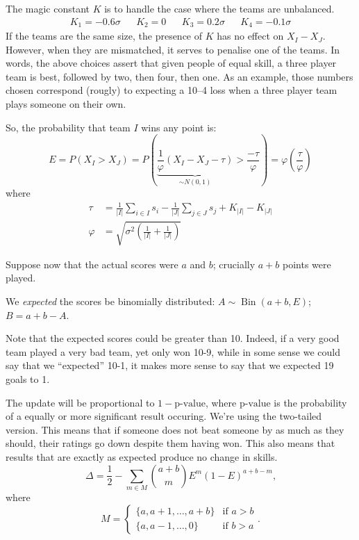 \documentclass{article}
\begin{document}
The magic constant $K$ is to handle the case where the teams are unbalanced.
\begin{align*}
    K_1 = -0.6\sigma &&
    K_2 =  0 &&
    K_3 =  0.2\sigma &&
    K_4 = -0.1\sigma
\end{align*}
If the teams are the same size, the presence of $K$ has no effect on $X_I - X_J$. However, when they are mismatched, it serves to penalise one of the teams.
In words, the above choices assert that given people of equal skill, a three player team is best, followed by two, then four, then one. As an example, those numbers chosen correspond (rougly) to expecting a 10--4 loss when a three player team plays someone on their own.

So, the probability that team $I$ wins any point is:
\[
    E = P( X_I > X_J ) = P\left( \underbrace{ \frac{1}{\varphi} ( X_I - X_J - \tau ) }_{\sim N(0, 1)}
                                 > \frac{-\tau}{\varphi} \right)
                       = \varphi\left( \frac{\tau}{\varphi} \right)
\]
where
\begin{align*}
    \tau &= \frac{1}{|I|} \sum_{i \in I} s_i - \frac{1}{|J|} \sum_{j \in J} s_j + K_{|I|} - K_{|J|} \\
    \varphi &= \sqrt{ \sigma^2 \left( \frac{1}{|I|} + \frac{1}{|J|} \right) }
\end{align*}

Suppose now that the actual scores were $a$ and $b$; crucially $a + b$ points were played.

We {\it expected} the scores be binomially distributed: $A\sim\operatorname{Bin}(a + b, E)$; $B = a + b - A$.

Note that the expected scores could be greater than 10. Indeed, if a very good team played a very bad team, yet only won 10-9, while in some sense we could say that we ``expected'' 10-1, it makes more sense to say that we expected 19 goals to 1.

The update will be proportional to $1 - \text{p-value}$, where $\text{p-value}$ is the probability of a equally or more significant result occuring. We're using the two-tailed version. This means that if someone does not beat someone by as much as they should, their ratings go down despite them having won. This also means that results that are exactly as expected produce no change in skills.
\[
    \Delta = \frac{1}{2} - \sum_{m \in M} {a + b \choose m} E^m (1 - E)^{a + b - m}
    \text{,}
\]
where
\[
    M = \begin{cases}
        \{ a, a + 1, \ldots, a + b \}  &\text{if } a > b \\
        \{ a, a - 1, \ldots, 0 \}      &\text{if } b > a
    \end{cases}
    \text{.}
\]
\end{document}
